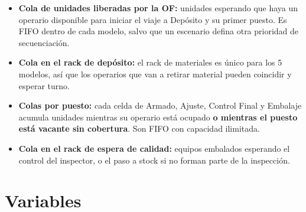 \documentclass[11pt,a4paper]{article}
\begin{document}
\begin{itemize}
  \item \textbf{Cola de unidades liberadas por la OF:} unidades esperando que haya un operario disponible para iniciar el viaje a Depósito y su primer puesto. Es FIFO dentro de cada modelo, salvo que un escenario defina otra prioridad de secuenciación.
  \item \textbf{Cola en el rack de depósito:} el rack de materiales es único para los 5 modelos, así que los operarios que van a retirar material pueden coincidir y esperar turno.
  \item \textbf{Colas por puesto:} cada celda de Armado, Ajuste, Control Final y Embalaje acumula unidades mientras su operario está ocupado \textbf{o mientras el puesto está vacante sin cobertura}. Son FIFO con capacidad ilimitada.
  \item \textbf{Cola en el rack de espera de calidad:} equipos embalados esperando el control del inspector, o el paso a stock si no forman parte de la inspección.
\end{itemize}

\section{Variables}
\end{document}
